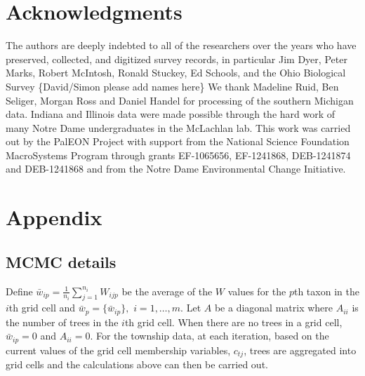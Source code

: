 \documentclass[12pt]{article}\usepackage[]{graphicx}\usepackage[]{color}
\begin{document}
\section*{Acknowledgments}

The authors are deeply indebted to all of the researchers over the
years who have preserved, collected, and digitized survey records,
in particular Jim Dyer, Peter Marks, Robert McIntosh, Ronald Stuckey,
Ed Schools, and the Ohio Biological Survey \{David/Simon please add
names here\} We thank Madeline Ruid, Ben Seliger, Morgan Ross and
Daniel Handel for processing of the southern Michigan data. Indiana
and Illinois data were made possible through the hard work of many
Notre Dame undergraduates in the McLachlan lab. This work was carried
out by the PalEON Project with support from the National Science Foundation
MacroSystems Program through grants EF-1065656, EF-1241868, DEB-1241874
and DEB-1241868 and from the Notre Dame Environmental Change Initiative. 






\section{Appendix}


\subsection{MCMC details}

Define $\bar{w}_{ip}=\frac{1}{n_{i}}{\displaystyle \sum_{j=1}^{n_{i}}W_{ijp}}$
be the average of the $W$ values for the $p$th taxon in the $i$th
grid cell and $\bar{w}_{p}=\{\bar{w}_{ip}\},$ $i=1,\ldots,m$. Let
$A$ be a diagonal matrix where $A_{ii}$ is the number of trees in
the $i$th grid cell. When there are no trees in a grid cell, $\bar{w}_{ip}=0$
and $A_{ii}=0$. For the township data, at each iteration, based on
the current values of the grid cell membership variables, $c_{tj}$,
trees are aggregated into grid cells and the calculations above can
then be carried out.
\end{document}
